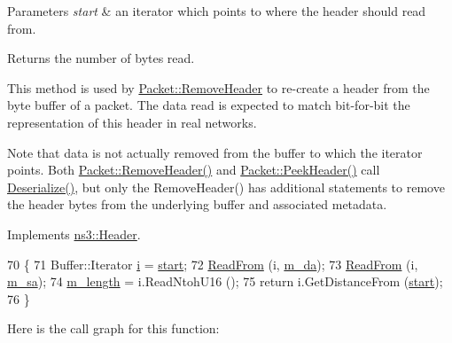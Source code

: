 \begin{DoxyParams}{Parameters}
{\em start} & an iterator which points to where the header should read from. \\
\hline
\end{DoxyParams}
\begin{DoxyReturn}{Returns}
the number of bytes read.
\end{DoxyReturn}
This method is used by \hyperlink{classns3_1_1Packet_a0961eccf975d75f902d40956c93ba63e}{Packet\+::\+Remove\+Header} to re-\/create a header from the byte buffer of a packet. The data read is expected to match bit-\/for-\/bit the representation of this header in real networks.

Note that data is not actually removed from the buffer to which the iterator points. Both \hyperlink{classns3_1_1Packet_a0961eccf975d75f902d40956c93ba63e}{Packet\+::\+Remove\+Header()} and \hyperlink{classns3_1_1Packet_aadc63487bea70945c418f4c3e9b81964}{Packet\+::\+Peek\+Header()} call \hyperlink{classns3_1_1AmsduSubframeHeader_a9b093c3b2ef78c73c62b9497f35809e2}{Deserialize()}, but only the Remove\+Header() has additional statements to remove the header bytes from the underlying buffer and associated metadata. 

Implements \hyperlink{classns3_1_1Header_a78be9400bb66b2a8543606f395ef5396}{ns3\+::\+Header}.


\begin{DoxyCode}
70 \{
71   Buffer::Iterator \hyperlink{bernuolliDistribution_8m_a6f6ccfcf58b31cb6412107d9d5281426}{i} = \hyperlink{namespacevisualizer_1_1core_a2a35e5d8a34af358b508dac8635754e0}{start};
72   \hyperlink{namespacens3_aeeba9f1570f031f9e401f76f51943805}{ReadFrom} (i, \hyperlink{classns3_1_1AmsduSubframeHeader_a793d99a78d90657d3c38db92747f969b}{m\_da});
73   \hyperlink{namespacens3_aeeba9f1570f031f9e401f76f51943805}{ReadFrom} (i, \hyperlink{classns3_1_1AmsduSubframeHeader_a5a466a28217906fb51eef59c1aa75e9b}{m\_sa});
74   \hyperlink{classns3_1_1AmsduSubframeHeader_a65dd60738ed7dae4bb4157dd05441ec1}{m\_length} = i.ReadNtohU16 ();
75   \textcolor{keywordflow}{return} i.GetDistanceFrom (\hyperlink{namespacevisualizer_1_1core_a2a35e5d8a34af358b508dac8635754e0}{start});
76 \}
\end{DoxyCode}


Here is the call graph for this function\+:


